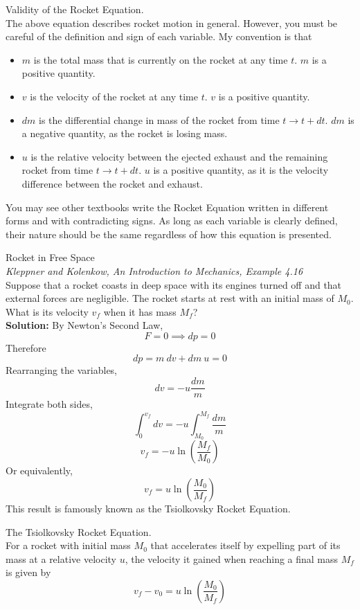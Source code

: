 \documentclass[11pt]{article}
\theoremstyle{gangnamstyle}{\newtheorem{definition}{Definition}[]}
\theoremstyle{gangnamstyle}{\newtheorem{example}{Example}[]}
\theoremstyle{gangnamstyle}{\newtheorem{problem}{Problem}[]}
\theoremstyle{gangnamstyle}{\newtheorem{warning}{Warning}[]}
\begin{document}
\begin{warning}
Validity of the Rocket Equation. \\
The above equation describes rocket motion in general. However, you must be careful of the definition and sign of each variable. My convention is that 
\begin{itemize}
\item $m$ is the total mass that is currently on the rocket at any time $t$. $m$ is a positive quantity. 
\item $v$ is the velocity of the rocket at any time $t$. $v$ is a positive quantity.
\item $dm$ is the differential change in mass of the rocket from time $t \rightarrow t 
+ dt$. $dm$ is a negative quantity, as the rocket is losing mass. 
\item $u$ is the relative velocity between the ejected exhaust and the remaining rocket from time $t \rightarrow t + dt$. $u$ is a positive quantity, as it is the velocity difference between the rocket and exhaust. 
\end{itemize}
You may see other textbooks write the Rocket Equation written in different forms and with contradicting signs. As long as each variable is clearly defined, their nature should be the same regardless of how this equation is presented. 
\end{warning}

\begin{example}
Rocket in Free Space \\
\textit{Kleppner and Kolenkow, An Introduction to Mechanics, Example 4.16} \\
Suppose that a rocket coasts in deep space with its engines turned off and that external forces are negligible. The rocket starts at rest with an initial mass of $M_0$. What is its velocity $v_f$ when it has mass $M_f$? \\ 

\textbf{Solution:} By Newton's Second Law, 
\[ F = 0 \implies dp = 0 \]
Therefore
\[ dp = m \ dv + dm \ u = 0 \]
Rearranging the variables, 
\[ dv = -u \frac{dm}{m} \]
Integrate both sides,
\[ \int_0^{v_f} dv = -u \int_{M_0}^{M_f} \frac{dm}{m} \]
\[ v_f = -u \ln(\frac{M_f}{M_0}) \]
Or equivalently, 
\[ v_f = u \ln(\frac{M_0}{M_f}) \]
This result is famously known as the Tsiolkovsky Rocket Equation. 
\end{example}

\begin{definition}
The Tsiolkovsky Rocket Equation. \\
For a rocket with initial mass $M_0$ that accelerates itself by expelling part of its mass at a relative velocity $u$, the velocity it gained when reaching a final mass $M_f$ is given by
\begin{equation}
v_f - v_0 = u \ln(\frac{M_0}{M_f})
\end{equation}
\end{definition}
\end{document}
